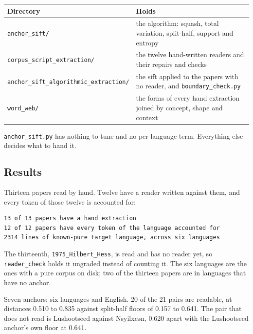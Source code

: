 \tiny
\setlength{\tabcolsep}{2pt}
\begin{longtable}{@{}>{\setlength{\rightskip}{0pt}\setlength{\parfillskip}{0pt}\arraybackslash}p{}>{\setlength{\rightskip}{0pt}\setlength{\parfillskip}{0pt}\arraybackslash}p{}@{}}
\toprule
Directory & Holds \\
\midrule
\texttt{anchor\_\allowbreak{}sift/\allowbreak{}} & the algorithm: squash, total variation, split-half, support and entropy \\
\texttt{corpus\_\allowbreak{}script\_\allowbreak{}extraction/\allowbreak{}} & the twelve hand-written readers and their repairs and checks \\
\texttt{anchor\_\allowbreak{}sift\_\allowbreak{}algorithmic\_\allowbreak{}extraction/\allowbreak{}} & the sift applied to the papers with no reader, and \texttt{boundary\_\allowbreak{}check.\allowbreak{}py} \\
\texttt{word\_\allowbreak{}web/\allowbreak{}} & the forms of every hand extraction joined by concept, shape and context \\
\bottomrule
\end{longtable}
\normalsize

\texttt{anchor\_\allowbreak{}sift.\allowbreak{}py} has nothing to tune and no per-language term. Everything else decides what to hand it.

\subsection{Results}

Thirteen papers read by hand. Twelve have a reader written against them, and every token of those twelve is accounted for:

\begin{lstlisting}[breaklines=true,breakatwhitespace=false,basicstyle=\ttfamily\small]
13 of 13 papers have a hand extraction
12 of 12 papers have every token of the language accounted for
2314 lines of known-pure target language, across six languages
\end{lstlisting}

The thirteenth, \texttt{1975\_\allowbreak{}Hilbert\_\allowbreak{}Hess}, is read and has no reader yet, so \texttt{reader\_\allowbreak{}check} holds it ungraded instead of counting it. The six languages are the ones with a pure corpus on disk; two of the thirteen papers are in languages that have no anchor.

Seven anchors: six languages and English. 20 of the 21 pairs are readable, at distances 0.510 to 0.835 against split-half floors of 0.157 to 0.641. The pair that does not read is Lushootseed against Nsyilxcən, 0.620 apart with the Lushootseed anchor's own floor at 0.641.

